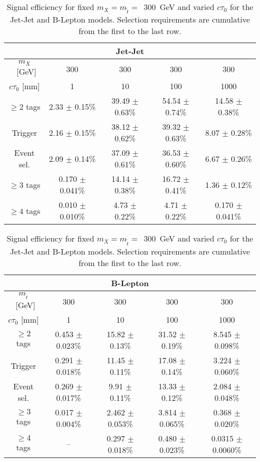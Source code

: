 
\begin{table}[tb]
\begin{center}
  \caption{ Signal efficiency for fixed $m_{X}=m_{\tilde{t}}=$~300~GeV
    and varied $c\tau_0$ for the Jet-Jet and B-Lepton models. Selection requirements are cumulative from
    the first to the last row. \label{tab:cutflow_300gev}}
\begin{tabular}{ccccc} 
 \multicolumn{5}{c}{\textbf{Jet-Jet}} \\
 \hline 
 $m_{X}$~[GeV] & 300 & 300 & 300 & 300 \\ 
 $c\tau_0$ [mm] & 1 & 10 & 100 & 1000 \\ 
 \hline 
 $\geq 2$ tags & 2.33 $\pm$ 0.15\% & 39.49 $\pm$ 0.63\% & 54.54 $\pm$ 0.74\% & 14.58 $\pm$ 0.38\% \\ 
 Trigger & 2.16 $\pm$ 0.15\% & 38.12 $\pm$ 0.62\% & 39.32 $\pm$ 0.63\% & 8.07 $\pm$ 0.28\% \\ 
 Event sel.& 2.09 $\pm$ 0.14\% & 37.09 $\pm$ 0.61\% & 36.53 $\pm$ 0.60\% & 6.67 $\pm$ 0.26\% \\ 
 $\geq 3$ tags &       0.170 $\pm$ 0.041\% &       14.14 $\pm$ 0.38\% &   16.72 $\pm$ 0.41\% &    1.36 $\pm$ 0.12\% \\  
 $\geq 4$ tags &       0.010 $\pm$ 0.010\% &       4.73 $\pm$ 0.22\% &    4.71 $\pm$ 0.22\% &     0.170 $\pm$ 0.041\% \\
\end{tabular}
\end{center}

\begin{center}
\begin{tabular}{ccccc} 
\multicolumn{5}{c}{\textbf{B-Lepton}} \\
 \hline 
$m_{\tilde{t}}$~[GeV] & 300 & 300 & 300 & 300 \\ 
$c\tau_0$ [mm] & 1 & 10 & 100 & 1000 \\ 
\hline 
$\geq 2$ tags &        0.453 $\pm$ 0.023\% &   15.82 $\pm$ 0.13\% &    31.52 $\pm$ 0.19\% &    8.545 $\pm$ 0.098\% \\ 
Trigger &     0.291 $\pm$ 0.018\% &        11.45 $\pm$ 0.11\% &   17.08 $\pm$ 0.14\% &    3.224 $\pm$ 0.060\% \\ 
Event sel. &   0.269 $\pm$ 0.017\% &  9.91 $\pm$ 0.11\% &    13.33 $\pm$ 0.12\% &    2.084 $\pm$ 0.048\% \\ 
$\geq 3$ tags &     0.017 $\pm$ 0.004\% &  2.462 $\pm$ 0.053\% &  3.814 $\pm$ 0.065\% &   0.368 $\pm$ 0.020\% \\ 
$\geq 4$ tags &      -- &      0.297 $\pm$ 0.018\% &  0.480 $\pm$ 0.023\% &   0.0315 $\pm$ 0.0060\% \\ 
\end{tabular}
\end{center}
\end{table}

